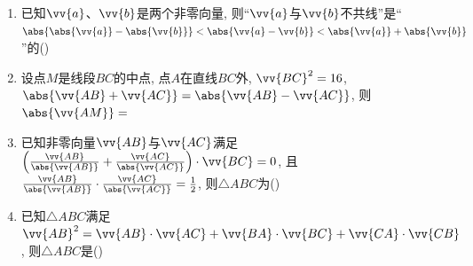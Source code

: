 \begin{enumerate}
\item 已知$\vv{a}$、$\vv{b}$是两个非零向量, 则``$\vv{a}$与$\vv{b}$不共线''是``$\abs{\abs{\vv{a}}-\abs{\vv{b}}}<\abs{\vv{a}-\vv{b}}<\abs{\vv{a}}+\abs{\vv{b}}$''的\dotfill()

\item 设点$M$是线段$BC$的中点, 点$A$在直线$BC$外, $\vv{BC}^2=16$, $\abs{\vv{AB}+\vv{AC}}=\abs{\vv{AB}-\vv{AC}}$, 则$\abs{\vv{AM}}=$

\item 已知非零向量$\vv{AB}$与$\vv{AC}$满足$\left(\frac{\vv{AB}}{\abs{\vv{AB}}}+\frac{\vv{AC}}{\abs{\vv{AC}}}\right)\cdot\vv{BC}=0$, 
且$\frac{\vv{AB}}{\abs{\vv{AB}}}\cdot\frac{\vv{AC}}{\abs{\vv{AC}}}=\frac{1}{2}$, 则$\triangle{ABC}$为\dotfill()

\item 已知$\triangle{ABC}$满足$\vv{AB}^2=\vv{AB}\cdot\vv{AC}+\vv{BA}\cdot\vv{BC}+\vv{CA}\cdot\vv{CB}$, 则$\triangle{ABC}$是\dotfill()


\end{enumerate}

